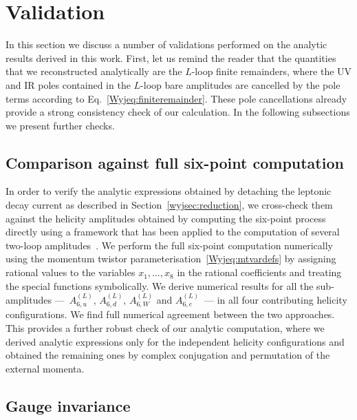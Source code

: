 \documentclass[main.tex]{subfiles}
\begin{document}
\section{Validation}
\label{wyjsec:validation}
In this section we discuss a number of validations performed on the analytic results derived in this work.
First, let us remind the reader that the quantities that we reconstructed analytically are the $L$-loop finite remainders, where the UV and IR poles contained in the $L$-loop bare amplitudes are cancelled by the pole terms according to Eq.~\eqref{Wyjeq:finiteremainder}. These pole cancellations already provide a strong consistency check of our calculation. In the following subsections we present further checks.
\subsection{Comparison against full six-point computation}
In order to verify the analytic expressions obtained by detaching the leptonic decay current as described in Section~\ref{wyjsec:reduction}, 
we cross-check them against the helicity amplitudes obtained by computing the six-point process directly using a framework that has been applied to the computation of several 
two-loop amplitudes~\cite{Hartanto:2019uvl,Badger:2021owl,Badger:2021imn,Badger:2021ega}. We perform the full six-point computation numerically using the momentum twistor parameterisation~\eqref{Wyjeq:mtvardefs} by assigning rational values to the variables $x_1, \ldots, x_8$ in the rational coefficients and treating the special functions symbolically. We derive numerical results for all the sub-amplitudes ---~$A^{(L)}_{6,u}$, $A^{(L)}_{6,d}$, $A^{(L)}_{6,W}$ and $A^{(L)}_{6,e}$~--- in all four contributing helicity configurations. We find full numerical agreement between the two approaches. 
This provides a further robust check of our analytic computation, where we derived analytic expressions only for the independent helicity configurations and obtained the remaining ones by complex conjugation and permutation of the external momenta.


\subsection{Gauge invariance}
\end{document}
